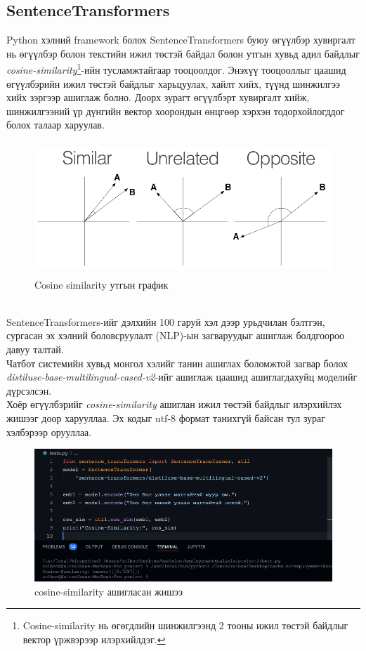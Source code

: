 \subsection{SentenceTransformers}
Python хэлний framework болох SentenceTransformers \cite{sentenceTransform} буюу өгүүлбэр хувиргалт нь өгүүлбэр болон текстийн ижил төстэй байдал болон утгын хувьд адил байдлыг \textit{cosine-similarity}\footnote{Cosine-similarity нь өгөгдлийн шинжилгээнд 2 тооны ижил төстэй байдлыг вектор үржвэрээр илэрхийлдэг.}-ийн тусламжтайгаар тооцоолдог. Энэхүү тооцооллыг цаашид өгүүлбэрийн ижил төстэй байдлыг харьцуулах, хайлт хийх, түүнд шинжилгээ хийх зэргээр ашиглаж болно. Доорх зурагт өгүүлбэрт хувиргалт хийж, шинжилгээний үр дүнгийн вектор хоорондын өнцгөөр хэрхэн тодорхойлогддог болох талаар харуулав.
\begin{figure}[ht]
  \centering
  \includegraphics[height=5cm]{images/cosineSimilarity.png}
  \caption{Cosine similarity утгын график}\label{fig:cosineSimilarity}
\end{figure}
\\SentenceTransformers-ийг дэлхийн 100 гаруй хэл дээр урьдчилан бэлтгэн, сургасан эх хэлний боловсруулалт (NLP)-ын загваруудыг ашиглаж болдгоороо давуу талтай.
\\Чатбот системийн хувьд монгол хэлийг танин ашиглах боломжтой загвар болох \textit{distiluse-base-multilingual-cased-v2}\cite{sbert}-ийг ашиглаж цаашид ашиглагдахуйц моделийг дүрсэлсэн.
\\Хоёр өгүүлбэрийг \textit{cosine-similarity} ашиглан ижил төстэй байдлыг илэрхийлэх жишээг доор харууллаа. Эх кодыг utf-8 формат танихгүй байсан тул зураг хэлбэрээр орууллаа.
\\
\begin{figure}[ht]
  \includegraphics[width=\textwidth]{images/sbert.png}
  \caption{cosine-similarity ашигласан жишээ}\label{fig:cosineSimilarityExample}
\end{figure}
